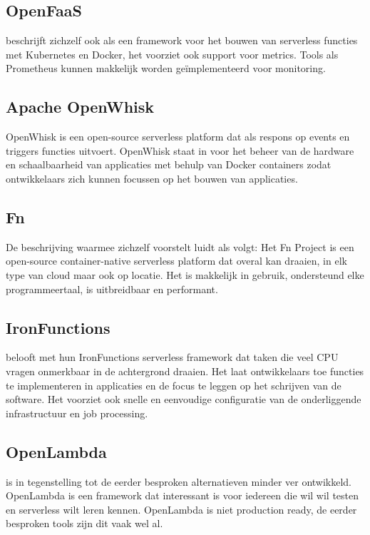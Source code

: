 \subsection{OpenFaaS}
\textcite{OpenFaaS2019} beschrijft zichzelf ook als een framework voor het bouwen van serverless functies met Kubernetes en Docker, het voorziet ook support voor metrics. Tools als Prometheus kunnen makkelijk worden geïmplementeerd voor monitoring.

\subsection{Apache OpenWhisk}
OpenWhisk is een open-source serverless platform dat als respons op events en triggers functies uitvoert. OpenWhisk staat in voor het beheer van de hardware en schaalbaarheid van applicaties met behulp van Docker containers zodat ontwikkelaars zich kunnen focussen op het bouwen van applicaties. \autocite{Apache2019}

\subsection{Fn}
De beschrijving waarmee \textcite{FnProject2019} zichzelf voorstelt luidt als volgt: Het Fn Project is een open-source container-native serverless platform dat overal kan draaien, in elk type van cloud maar ook op locatie. Het is makkelijk in gebruik, ondersteund elke programmeertaal, is uitbreidbaar en performant. 

\subsection{IronFunctions}
\textcite{Iron2018} belooft met hun IronFunctions serverless framework dat taken die veel CPU vragen onmerkbaar in de achtergrond draaien. Het laat ontwikkelaars toe functies te implementeren in applicaties en de focus te leggen op het schrijven van de software. Het voorziet ook snelle en eenvoudige configuratie van de onderliggende infrastructuur en job processing.

\subsection{OpenLambda}
\textcite{OpenLambda2019} is in tegenstelling tot de eerder besproken alternatieven minder ver ontwikkeld. OpenLambda is een framework dat interessant is voor iedereen die wil wil testen en serverless wilt leren kennen. OpenLambda is niet production ready, de eerder besproken tools zijn dit vaak wel al.

